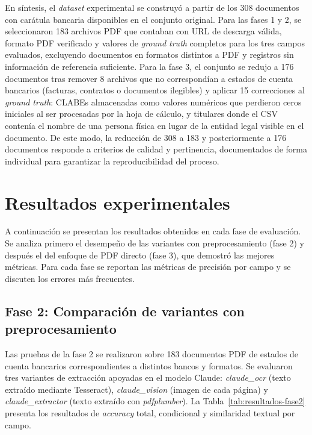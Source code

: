 En síntesis, el \textit{dataset} experimental se construyó a partir de los 308 documentos con carátula bancaria disponibles en el conjunto original. Para las fases 1 y 2, se seleccionaron 183 archivos PDF que contaban con URL de descarga válida, formato PDF verificado y valores de \textit{ground truth} completos para los tres campos evaluados, excluyendo documentos en formatos distintos a PDF y registros sin información de referencia suficiente. Para la fase 3, el conjunto se redujo a 176 documentos tras remover 8 archivos que no correspondían a estados de cuenta bancarios (facturas, contratos o documentos ilegibles) y aplicar 15 correcciones al \textit{ground truth}: CLABEs almacenadas como valores numéricos que perdieron ceros iniciales al ser procesadas por la hoja de cálculo, y titulares donde el CSV contenía el nombre de una persona física en lugar de la entidad legal visible en el documento. De este modo, la reducción de 308 a 183 y posteriormente a 176 documentos responde a criterios de calidad y pertinencia, documentados de forma individual para garantizar la reproducibilidad del proceso.


\section{Resultados experimentales}

A continuación se presentan los resultados obtenidos en cada fase de evaluación. Se analiza primero el desempeño de las variantes con preprocesamiento (fase 2) y después el del enfoque de PDF directo (fase 3), que demostró las mejores métricas. Para cada fase se reportan las métricas de precisión por campo y se discuten los errores más frecuentes.

\subsection{Fase 2: Comparación de variantes con preprocesamiento}

Las pruebas de la fase 2 se realizaron sobre 183 documentos PDF de estados de cuenta bancarios correspondientes a distintos bancos y formatos. Se evaluaron tres variantes de extracción apoyadas en el modelo Claude: \textit{claude\_ocr} (texto extraído mediante Tesseract), \textit{claude\_vision} (imagen de cada página) y \textit{claude\_extractor} (texto extraído con \textit{pdfplumber}). La Tabla~\ref{tab:resultados-fase2} presenta los resultados de \textit{accuracy} total, condicional y similaridad textual por campo.


